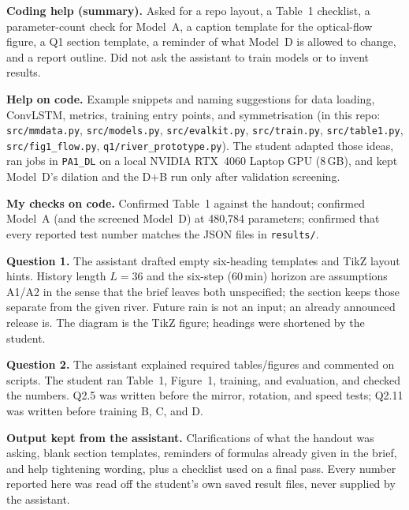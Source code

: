 \noindent\textbf{Coding help (summary).} Asked for a repo layout, a Table~1 checklist, a parameter-count check for Model~A, a caption template for the optical-flow figure, a Q1 section template, a reminder of what Model~D is allowed to change, and a report outline. Did not ask the assistant to train models or to invent results.

\noindent\textbf{Help on code.} Example snippets and naming suggestions for data loading, ConvLSTM, metrics, training entry points, and symmetrisation (in this repo: \texttt{src/mmdata.py}, \texttt{src/models.py}, \texttt{src/evalkit.py}, \texttt{src/train.py}, \texttt{src/table1.py}, \texttt{src/fig1\_flow.py}, \texttt{q1/river\_prototype.py}). The student adapted those ideas, ran jobs in \texttt{PA1\_DL} on a local NVIDIA RTX~4060 Laptop GPU (8\,GB), and kept Model~D's dilation and the D$+$B run only after validation screening.

\noindent\textbf{My checks on code.} Confirmed Table~1 against the handout; confirmed Model~A (and the screened Model~D) at 480{,}784 parameters; confirmed that every reported test number matches the JSON files in \texttt{results/}.

\noindent\textbf{Question 1.} The assistant drafted empty six-heading templates and TikZ layout hints. History length $L{=}36$ and the six-step (60\,min) horizon are assumptions A1/A2 in the sense that the brief leaves both unspecified; the section keeps those separate from the given river. Future rain is not an input; an already announced release is. The diagram is the TikZ figure; headings were shortened by the student.

\noindent\textbf{Question 2.} The assistant explained required tables/figures and commented on scripts. The student ran Table~1, Figure~1, training, and evaluation, and checked the numbers. Q2.5 was written before the mirror, rotation, and speed tests; Q2.11 was written before training B, C, and D.

\noindent\textbf{Output kept from the assistant.} Clarifications of what the handout was asking, blank section templates, reminders of formulas already given in the brief, and help tightening wording, plus a checklist used on a final pass. Every number reported here was read off the student's own saved result files, never supplied by the assistant.
